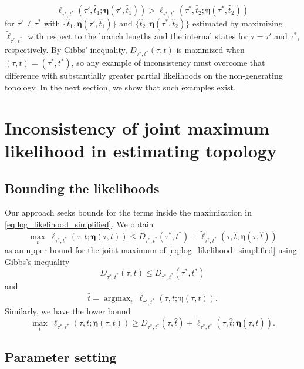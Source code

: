 \documentclass{article}
\newcommand{\fullAncestralSplitPartitions}{\boldsymbol\eta}
\newcommand{\shannonDivergence}{D}
\DeclareMathOperator*{\argmax}{argmax}
\begin{document}
\begin{equation}
\label{eq:inconsistency_inequality}
\ell_{\tau^*,t^*}(\tau', \hat{t}_1; \fullAncestralSplitPartitions(\tau', \hat{t}_1)) > \ell_{\tau^*,t^*}(\tau^*, \hat{t}_2; \fullAncestralSplitPartitions(\tau^*, \hat{t}_2))
\end{equation}
for $\tau'\neq\tau^*$ with $\{\hat{t}_1,\fullAncestralSplitPartitions(\tau', \hat{t}_1)\}$ and $\{\hat{t}_2,\fullAncestralSplitPartitions(\tau^*, \hat{t}_2)\}$ estimated by maximizing $\tilde{\ell}_{\tau^*,t^*}$ with respect to the branch lengths and the internal states for $\tau = \tau'$ and $\tau^*$, respectively.
By Gibbs' inequality, $\shannonDivergence_{\tau^*,t^*}(\tau,t)$ is maximized when $(\tau,t) = (\tau^*,t^*)$, so any example of inconsistency must overcome that difference with substantially greater partial likelihoods on the non-generating topology.
In the next section, we show that such examples exist.

\section{Inconsistency of joint maximum likelihood in estimating topology}

\subsection{Bounding the likelihoods}

Our approach seeks bounds for the terms inside the maximization in \eqref{eq:log_likelihood_simplified}.
We obtain
$$
\max_{t} \ \ell_{\tau^*,t^*}(\tau, t; \fullAncestralSplitPartitions(\tau,t)) \le
    \shannonDivergence_{\tau^*,t^*}(\tau^*,t^*)
    + \tilde{\ell}_{\tau^*,t^*}(\tau, \hat{t}; \fullAncestralSplitPartitions(\tau, \hat{t}))
$$
as an upper bound for the joint maximum of \eqref{eq:log_likelihood_simplified} using Gibbs's inequality
$$
\shannonDivergence_{\tau^*,t^*}(\tau,t) \le \shannonDivergence_{\tau^*,t^*}(\tau^*,t^*)
$$
and
$$
\hat{t} = \argmax_{t} \ \tilde{\ell}_{\tau^*,t^*}(\tau, t; \fullAncestralSplitPartitions(\tau,t)).
$$
Similarly, we have the lower bound
$$
\max_{t} \ \ell_{\tau^*,t^*}(\tau, t; \fullAncestralSplitPartitions(\tau,t)) \ge
    \shannonDivergence_{\tau^*,t^*}(\tau,\hat{t})
    + \tilde{\ell}_{\tau^*,t^*}(\tau, \hat{t}; \fullAncestralSplitPartitions(\tau, \hat{t})).
$$

\subsection{Parameter setting}
\end{document}
